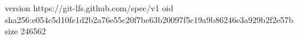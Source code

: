 version https://git-lfs.github.com/spec/v1
oid sha256:e054c5d10fe1d2b2a76e55c20f7be63b20097f5c19a9b86246e3a929b2f2e57b
size 246562
